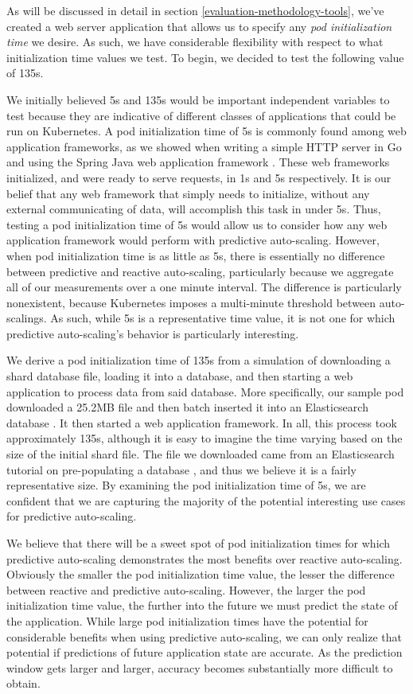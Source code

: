 As will be discussed in detail in section \ref{evaluation-methodology-tools},
we've created a web server application that allows us to specify any \textit{pod
initialization time} we desire. As such, we have considerable flexibility with
respect to what initialization time values we test. To begin, we decided to test the
following value of 135s.

We initially believed 5s and 135s would be important independent variables to test because they
are indicative of different classes of applications that could be run on
Kubernetes. A pod initialization time of 5s is commonly found among web
application frameworks, as we showed when writing a simple HTTP server in Go and
using the Spring Java web application framework \cite{spring}. These web
frameworks initialized, and were ready to serve requests, in 1s and 5s
respectively. It is our belief that any web framework that simply
needs to initialize, without any external communicating of data, will
accomplish this task in under 5s. Thus, testing a pod initialization time of 5s
would allow us to consider how any web application framework would perform with
predictive auto-scaling. However, when pod initialization time is as little as
5s, there is essentially no difference between predictive and reactive
auto-scaling, particularly because we aggregate all of our measurements over a
one minute interval. The difference is particularly nonexistent, because
Kubernetes imposes a multi-minute threshold between auto-scalings.
As such, while 5s is a representative time value, it is not
one for which predictive auto-scaling's behavior is particularly interesting.

We derive a pod initialization time of 135s from a simulation of downloading a
shard database file, loading it into a database, and then starting a web
application to process data from said database. More specifically, our sample
pod downloaded a 25.2MB file and then batch inserted it into an Elasticsearch
database \cite{elasticsearch}. It then started a web application framework. In
all, this process took approximately 135s, although it is easy to imagine the
time varying based on the size of the initial shard file. The file we downloaded
came from an Elasticsearch tutorial on pre-populating a database
\cite{elasticsearch-import-some-data}, and thus we believe it is a fairly
representative size. By examining the pod initialization time of 5s, we
are confident that we are capturing the majority of the potential interesting use cases for
predictive auto-scaling.

We believe that there will be a sweet spot of pod initialization times
for which predictive auto-scaling demonstrates the most benefits over reactive
auto-scaling. Obviously the smaller the pod initialization time value, the lesser
the difference between reactive and predictive auto-scaling.
However, the larger the pod initialization time value, the further into
the future we must predict the state of the application. While large pod
initialization times have the potential for considerable benefits when using
predictive auto-scaling, we can only realize that potential if predictions of
future application state are accurate. As the prediction window gets larger and
larger, accuracy becomes substantially more difficult to obtain.
